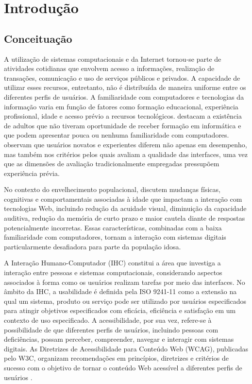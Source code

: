 \chapter{Introdução}

\section{Conceituação}

A utilização de sistemas computacionais e da Internet tornou-se parte de atividades cotidianas que envolvem acesso a informações, realização de transações, comunicação e uso de serviços públicos e privados. A capacidade de utilizar esses recursos, entretanto, não é distribuída de maneira uniforme entre os diferentes perfis de usuários. A familiaridade com computadores e tecnologias da informação varia em função de fatores como formação educacional, experiência profissional, idade e acesso prévio a recursos tecnológicos. \cite{kabassi2004personalised} destacam a existência de adultos que não tiveram oportunidade de receber formação em informática e que podem apresentar pouca ou nenhuma familiaridade com computadores. \cite{nosseir2011novice} observam que usuários novatos e experientes diferem não apenas em desempenho, mas também nos critérios pelos quais avaliam a qualidade das interfaces, uma vez que as dimensões de avaliação tradicionalmente empregadas pressupõem experiência prévia.

No contexto do envelhecimento populacional, \cite{ahmad2013teaching} discutem mudanças físicas, cognitivas e comportamentais associadas à idade que impactam a interação com tecnologias Web, incluindo redução da acuidade visual, diminuição da capacidade auditiva, redução da memória de curto prazo e maior cautela diante de respostas potencialmente incorretas. Essas características, combinadas com a baixa familiaridade com computadores, tornam a interação com sistemas digitais particularmente desafiadora para parte da população idosa.

A Interação Humano-Computador (IHC) constitui a área que investiga a interação entre pessoas e sistemas computacionais, considerando aspectos associados à forma como os usuários realizam tarefas por meio das interfaces. No âmbito da IHC, a usabilidade é definida pela ISO 9241-11 como a extensão na qual um sistema, produto ou serviço pode ser utilizado por usuários especificados para atingir objetivos especificados com eficácia, eficiência e satisfação em um contexto de uso especificado. A acessibilidade, por sua vez, refere-se à possibilidade de que diferentes perfis de usuários, incluindo pessoas com deficiências, possam perceber, compreender, navegar e interagir com sistemas digitais. As Diretrizes de Acessibilidade para Conteúdo Web (WCAG), publicadas pelo W3C, organizam recomendações em princípios, diretrizes e critérios de sucesso com o objetivo de tornar o conteúdo Web acessível a diferentes perfis de usuários \cite{sun2010preliminary}.

